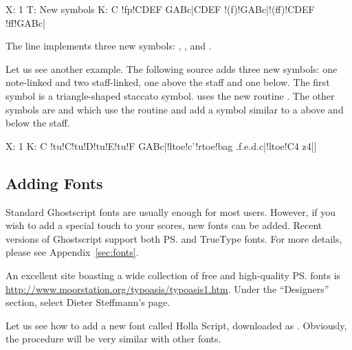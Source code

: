 \documentclass[a4paper,12pt]{book}
\begin{document}
\begin{abcsource}
X: 1
T: New symbols
K: C
!fp!CDEF GABc|CDEF !(f)!GABc|!(ff)!CDEF !ff!GABc|
\end{abcsource}


The  line implements three new symbols: ,
, and .

Let us see another example. The following source adds three new
symbols: one note-linked and two staff-linked, one above the staff and
one below. The first symbol  is a triangle-shaped staccato
symbol.  uses the new routine . The other
symbols are  and  which use the routine
 and add a symbol similar to a \car{\textasciicircum} above
and below the staff.

\begin{abcsource}
X: 1
K: C
!tu!C!tu!D!tu!E!tu!F GABc|!ltoe!c'!rtoe!bag .f.e.d.c|!ltoe!C4 z4|]
\end{abcsource}



\subsection{Adding Fonts}
\label{sec:addfonts}

Standard Ghostscript fonts are usually enough for most users. However,
if you wish to add a special touch to your scores, new fonts can be
added. Recent versions of Ghostscript support both \ps{} and TrueType
fonts. For more details, please see Appendix~\ref{sec:fonts}.

An excellent site boasting a wide collection of free and high-quality
\ps{} fonts is
\url{http://www.moorstation.org/typoasis/typoasis1.htm}. Under the
``Designers'' section, select Dieter Steff\-man\-n's page.

Let us see how to add a new font called Holla Script, downloaded as
. Obviously, the procedure will be very similar with
other fonts.
\end{document}

